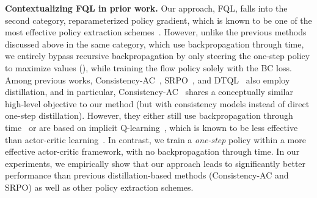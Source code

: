 \textbf{Contextualizing FQL in prior work.}
Our approach, FQL, falls into the second category, reparameterized policy gradient,
which is known to be one of the most effective policy extraction schemes~\citep{bottleneck_park2024}.
However, unlike the previous methods discussed above in the same category, which use backpropagation through time,
we entirely bypass recursive backpropagation
by only steering the one-step policy to maximize values (),
while training the flow policy solely with the BC loss.
%
%
%
%
Among previous works,
Consistency-AC~\citep{consistencyac_ding2024}, SRPO~\citep{srpo_chen2024}, and DTQL~\citep{dtql_chen2024}
also employ distillation,
and in particular, Consistency-AC~\citep{consistencyac_ding2024} shares a conceptually similar high-level objective to our method
(but with consistency models instead of direct one-step distillation).
However, they either still use backpropagation through time~\citep{consistencyac_ding2024}
or are based on implicit Q-learning~\citep{iql_kostrikov2022},
which is known to be less effective than actor-critic learning~\citep{rebrac_tarasov2023}.
In contrast, we train a \emph{one-step} policy within a more effective actor-critic framework,
with no backpropagation through time.
In our experiments,
we empirically show that our approach leads to significantly better performance
than previous distillation-based methods (Consistency-AC and SRPO) as well as other policy extraction schemes.
%


